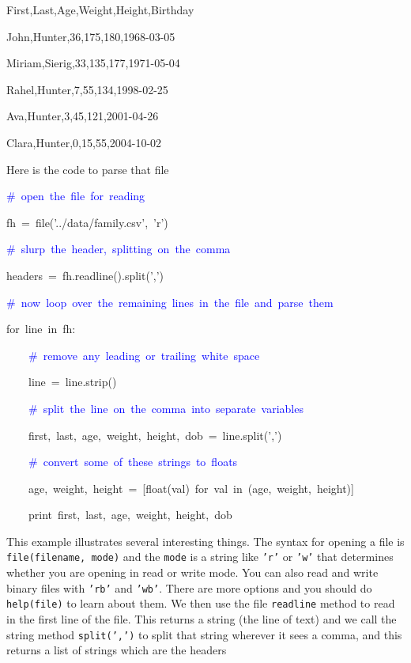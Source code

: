 \begin{lyxcode}
First,Last,Age,Weight,Height,Birthday

John,Hunter,36,175,180,1968-03-05

Miriam,Sierig,33,135,177,1971-05-04

Rahel,Hunter,7,55,134,1998-02-25

Ava,Hunter,3,45,121,2001-04-26

Clara,Hunter,0,15,55,2004-10-02
\end{lyxcode}
Here is the code to parse that file

\begin{lyxcode}
\textcolor{blue}{\#~open~the~file~for~reading}

fh~=~file('../data/family.csv',~'r')

\textcolor{blue}{\#~slurp~the~header,~splitting~on~the~comma}

headers~=~fh.readline().split(',')

\textcolor{blue}{\#~now~loop~over~the~remaining~lines~in~the~file~and~parse~them}

for~line~in~fh:

~~~~\textcolor{blue}{\#~remove~any~leading~or~trailing~white~space}

~~~~line~=~line.strip()

~~~~\textcolor{blue}{\#~split~the~line~on~the~comma~into~separate~variables}

~~~~first,~last,~age,~weight,~height,~dob~=~line.split(',')

~~~~\textcolor{blue}{\#~convert~some~of~these~strings~to~floats}

~~~~age,~weight,~height~=~{[}float(val)~for~val~in~(age,~weight,~height)]

~~~~print~first,~last,~age,~weight,~height,~dob
\end{lyxcode}
This example illustrates several interesting things. The syntax for
opening a file is \texttt{file(filename, mode)} and the \texttt{mode}
is a string like \texttt{'r'} or \texttt{'w'} that determines whether
you are opening in read or write mode. You can also read and write
binary files with \texttt{'rb'} and \texttt{'wb'}. There are more
options and you should do \texttt{help(file)} to learn about them.
We then use the file \texttt{readline} method to read in the first
line of the file. This returns a string (the line of text) and we
call the string method \texttt{split(',')} to split that string wherever
it sees a comma, and this returns a list of strings which are the
headers

